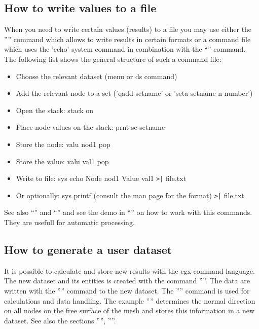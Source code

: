 \documentclass{article}
\begin{document}
\begin{appendix}
\subsection{\label{How to write values to a file}How to write values to a file}
When you need to write certain values (results) to a file you may use either the '''' command which allows to write results in certain formats or a command file which uses the 'echo' system command in combination with the ``'' command. The following list shows the general structure of such a command file:
\begin{itemize}
\item Choose the relevant dataset (menu or ds command)
\item Add the relevant node to a set ('qadd setname' or 'seta setname n number') 
\item Open the stack: stack on
\item Place node-values on the stack: prnt se setname
\item Store the node: valu nod1 pop 
\item Store the value: valu val1 pop 
\item Write to file: sys echo Node nod1 Value val1 \verb_>|_ file.txt
\item Or optionally: sys printf (consult the man page for the format) \verb_>|_ file.txt
\end{itemize}
See also ``'' and ``'' and see the demo in ``'' on how to work with this commands. They are usefull for automatic processing.

\subsection{\label{How to generate a user dataset}How to generate a user dataset}
It is possible to calculate and store new results with the cgx command language. The new dataset and its entities is created with the command ''''. The data are written with the '''' command to the new dataset. The '''' command is used for calculations and data handling. The example '''' determines the normal direction on all nodes on the free surface of the mesh and stores this information in a new dataset. See also the sections '''', ''''.


\end{appendix}
\end{document}
